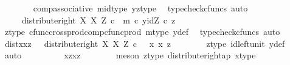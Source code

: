 \begin{isabellebody}
\ \ \ \ \ \ \isamarkupfalse%
\ comp{\isacharunderscore}{\kern0pt}associative{}\ mid{\isacharunderscore}{\kern0pt}type\ yz{\isacharunderscore}{\kern0pt}type\ \isamarkupfalse%
\ {\isacharparenleft}{\kern0pt}typecheck{\isacharunderscore}{\kern0pt}cfuncs{\isacharcomma}{\kern0pt}\ auto{\isacharparenright}{\kern0pt}\isanewline
\ \ \ \ \isamarkupfalse%
\ \isamarkupfalse%
\ {\isachardoublequoteopen}{\isachardot}{\kern0pt}{\isachardot}{\kern0pt}{\isachardot}{\kern0pt}\ \ {\isacharequal}{\kern0pt}\ \ distribute{\isacharunderscore}{\kern0pt}right\ X\ X\ Z\ {\isasymcirc}\isactrlsub c\ \ {\isasymlangle}m\ {\isasymcirc}\isactrlsub c\ y{\isacharcomma}{\kern0pt}id{\isacharparenleft}{\kern0pt}Z{\isacharparenright}{\kern0pt}\ {\isasymcirc}\isactrlsub c\ z{\isasymrangle}{\isachardoublequoteclose}\isanewline
\ \ \ \ \ \ \isamarkupfalse%
\ z{\isacharunderscore}{\kern0pt}type\ cfunc{\isacharunderscore}{\kern0pt}cross{\isacharunderscore}{\kern0pt}prod{\isacharunderscore}{\kern0pt}comp{\isacharunderscore}{\kern0pt}cfunc{\isacharunderscore}{\kern0pt}prod\ m{\isacharunderscore}{\kern0pt}type\ y{\isacharunderscore}{\kern0pt}def\ \isamarkupfalse%
\ {\isacharparenleft}{\kern0pt}typecheck{\isacharunderscore}{\kern0pt}cfuncs{\isacharcomma}{\kern0pt}\ auto{\isacharparenright}{\kern0pt}\isanewline
\ \ \ \ \isamarkupfalse%
\ \isamarkupfalse%
\ distxxz{\isacharcolon}{\kern0pt}\ {\isachardoublequoteopen}{\isachardot}{\kern0pt}{\isachardot}{\kern0pt}{\isachardot}{\kern0pt}\ {\isacharequal}{\kern0pt}\ distribute{\isacharunderscore}{\kern0pt}right\ X\ X\ Z\ {\isasymcirc}\isactrlsub c\ \ {\isasymlangle}\ {\isasymlangle}x{\isacharcomma}{\kern0pt}\ x{\isasymrangle}{\isacharcomma}{\kern0pt}\ z{\isasymrangle}{\isachardoublequoteclose}\isanewline
\ \ \ \ \ \ \isamarkupfalse%
\ z{\isacharunderscore}{\kern0pt}type\ id{\isacharunderscore}{\kern0pt}left{\isacharunderscore}{\kern0pt}unit{}\ y{\isacharunderscore}{\kern0pt}def\ \isamarkupfalse%
\ auto\isanewline
\ \ \ \ \isamarkupfalse%
\ \isamarkupfalse%
\ {\isachardoublequoteopen}{\isachardot}{\kern0pt}{\isachardot}{\kern0pt}{\isachardot}{\kern0pt}\ {\isacharequal}{\kern0pt}\ {\isasymlangle}{\isasymlangle}x{\isacharcomma}{\kern0pt}z{\isasymrangle}{\isacharcomma}{\kern0pt}{\isasymlangle}x{\isacharcomma}{\kern0pt}z{\isasymrangle}{\isasymrangle}{\isachardoublequoteclose}\isanewline
\ \ \ \ \ \ \isamarkupfalse%
\ {\isacharparenleft}{\kern0pt}meson\ z{\isacharunderscore}{\kern0pt}type\ distribute{\isacharunderscore}{\kern0pt}right{\isacharunderscore}{\kern0pt}ap\ x{\isacharunderscore}{\kern0pt}type{\isacharparenright}{\kern0pt}\isanewline

\end{isabellebody}
